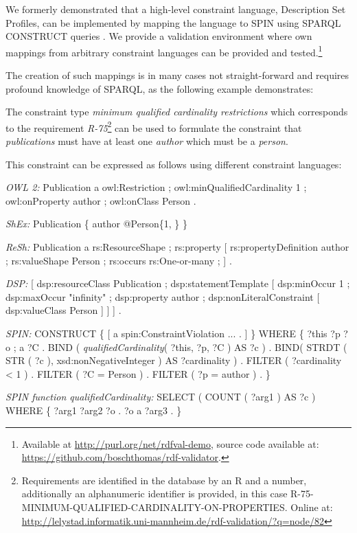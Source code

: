 \documentclass[a4paper,fontsize=11pt]{scrartcl}
\begin{document}
We formerly demonstrated that a high-level constraint language, Description Set Profiles, can be implemented by mapping the language to SPIN using SPARQL CONSTRUCT queries \cite{BoschEckert2014-2}. We provide a validation environment where own mappings from arbitrary constraint languages can be provided and tested.\footnote{Available at \url{http://purl.org/net/rdfval-demo}, source code available at: \url{https://github.com/boschthomas/rdf-validator}.}

The creation of such mappings is in many cases not straight-forward and requires profound knowledge of SPARQL, as the following example demonstrates:

The constraint type \emph{minimum qualified cardinality restrictions} which corresponds to the requirement \emph{R-75}\footnote{Requirements are identified in the database by an R and a number, additionally an alphanumeric identifier is provided, in this case R-75-MINIMUM-QUALIFIED-CARDINALITY-ON-PROPERTIES. Online at: \url{http://lelystad.informatik.uni-mannheim.de/rdf-validation/?q=node/82}} can be used to formulate the constraint
that \emph{publications} must have at least one \emph{author} which must be a \emph{person}.

This constraint can be expressed as follows using different constraint languages:

\begin{ex}[commandchars=\\\{\}]
\textit{OWL 2:} Publication a owl:Restriction ;
          owl:minQualifiedCardinality 1 ;
          owl:onProperty author ;
          owl:onClass Person .
		
\textit{ShEx:} Publication \{ author @Person\{1, \} \}

\textit{ReSh:} Publication a rs:ResourceShape ; rs:property [
          rs:propertyDefinition author ;
          rs:valueShape Person ;
          rs:occurs rs:One-or-many ; ] .
		
\textit{DSP:} [ dsp:resourceClass Publication ; dsp:statementTemplate [ 
          dsp:minOccur 1 ; dsp:maxOccur "infinity" ; 
          dsp:property author ; 
          dsp:nonLiteralConstraint [ dsp:valueClass Person ] ] ] .
					
\textit{SPIN:} CONSTRUCT \{ [ a spin:ConstraintViolation ... . ] \} WHERE \{ 
          ?this ?p ?o ; a ?C .
          BIND ( \textit{qualifiedCardinality}( ?this, ?p, ?C ) AS ?c ) .
          BIND( STRDT ( STR ( ?c ), xsd:nonNegativeInteger ) AS ?cardinality ) .
          FILTER ( ?cardinality < 1 ) . 
          FILTER ( ?C = Person ) .
          FILTER ( ?p = author ) . \}
						
\textit{SPIN function qualifiedCardinality:}										
SELECT ( COUNT ( ?arg1 ) AS ?c ) WHERE \{ ?arg1 ?arg2 ?o . ?o a ?arg3 . \}
\end{ex}
\end{document}
